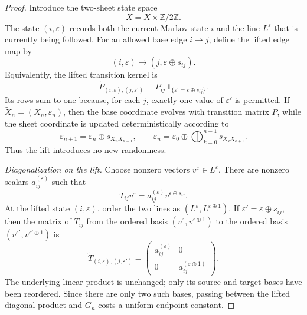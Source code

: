 \documentclass[11pt,a4paper]{amsart}
\theoremstyle{definition}
\theoremstyle{remark}
\numberwithin{equation}{section}
\newcommand{\1}{\boldsymbol 1}
\begin{document}
\begin{proof}
Introduce the two-sheet state space
$$
 X
 =X\times\mathbb Z/2\mathbb Z.
$$
The state $(i,\varepsilon)$ records both the current Markov state
$i$ and the line $L^\varepsilon$ that is currently being followed.
For an allowed base edge $i\to j$, define the lifted edge map by
\begin{equation}\label{eq:two-sheet-transition-detailed}
 (i,\varepsilon)\longrightarrow
 (j,\varepsilon\mathbin\oplus s_{ij}).
\end{equation}
Equivalently, the lifted transition kernel is
\begin{equation}\label{eq:two-sheet-kernel}
 \widetilde P_{(i,\varepsilon),(j,\varepsilon')}
 =P_{ij}\,
  \1_{\{\varepsilon'=\varepsilon\oplus s_{ij}\}}.
\end{equation}
Its rows sum to one because, for each $j$, exactly one value of
$\varepsilon'$ is permitted.  If
$\widetilde X_n=(X_n,\varepsilon_n)$, then the base coordinate
evolves with transition matrix $P$, while the sheet coordinate is
updated deterministically according to
\begin{equation}\label{eq:two-sheet-recursion}
 \varepsilon_{n+1}
 =\varepsilon_n\oplus s_{X_nX_{n+1}},
 \qquad
 \varepsilon_n
 =\varepsilon_0\oplus
   \bigoplus_{k=0}^{n-1}s_{X_kX_{k+1}}.
\end{equation}
Thus the lift introduces no new randomness.%

\medskip
\noindent
\emph{Diagonalization on the lift.}
Choose nonzero vectors $v^\varepsilon\in L^\varepsilon$.  There are
nonzero scalars $a_{ij}^{(\varepsilon)}$ such that
\begin{equation}\label{eq:two-sheet-line-multiplier}
 T_{ij}v^\varepsilon
 =a_{ij}^{(\varepsilon)}
  v^{\varepsilon\oplus s_{ij}}.
\end{equation}
At the lifted state $(i,\varepsilon)$, order the two lines as
$(L^\varepsilon,L^{\varepsilon\oplus1})$.  If
$\varepsilon'=\varepsilon\oplus s_{ij}$, then the matrix of
$T_{ij}$ from the ordered basis
$(v^\varepsilon,v^{\varepsilon\oplus1})$ to the ordered basis
$(v^{\varepsilon'},v^{\varepsilon'\oplus1})$ is
\begin{equation}\label{eq:two-sheet-diagonal-edge}
 \widetilde T_{(i,\varepsilon),(j,\varepsilon')}
 =\begin{pmatrix}
   a_{ij}^{(\varepsilon)}&0\\
   0&a_{ij}^{(\varepsilon\oplus1)}
  \end{pmatrix}.
\end{equation}
The underlying linear product is unchanged; only its source and target bases have been reordered.  Since there are only two such bases, passing between the lifted diagonal product and $G_n$ costs a uniform endpoint constant.


\end{proof}
\end{document}

